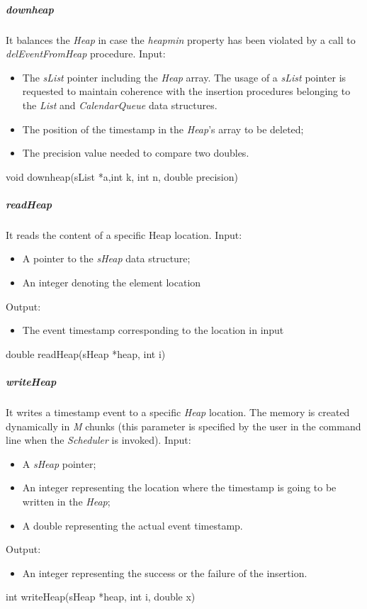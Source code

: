 \subparagraph{downheap}
It balances the \textit{Heap} in case the \textit{heapmin} property has been violated by a call to \textit{delEventFromHeap} procedure.
Input:
\begin{itemize}
\item The \textit{sList} pointer including the \textit{Heap} array. The usage of a \textit{sList} pointer  is requested to maintain coherence with
the insertion procedures belonging to the \textit{List} and \textit{CalendarQueue} data structures.
\item The position of the timestamp in the \textit{Heap}'s array to be deleted;
\item The precision value needed to compare two doubles.
\end{itemize}
void downheap(sList *a,int k,  int n, double precision)

\subparagraph{readHeap}
It reads the content of a specific Heap location.
Input:
\begin{itemize}
\item A pointer to the \textit{sHeap} data structure;
\item An integer denoting the element location
\end{itemize}
Output:
\begin{itemize}
\item The event timestamp corresponding to the location in input
\end{itemize}

double readHeap(sHeap *heap, int i)

\subparagraph{writeHeap}
It writes a timestamp event to a specific \textit{Heap} location. The memory is created dynamically in \textit{M} chunks (this parameter is specified by the user in the command line when
 the \textit{Scheduler} is invoked).
 Input:
 \begin{itemize}
 \item A \textit{sHeap} pointer;
 \item An integer representing the location where the timestamp is going to be written in the \textit{Heap};
 \item A double representing the actual event timestamp.
 \end{itemize}
 Output:
 \begin{itemize}
 \item An integer representing the success or the failure of the insertion.
 \end{itemize}
 int writeHeap(sHeap *heap, int i, double x)

